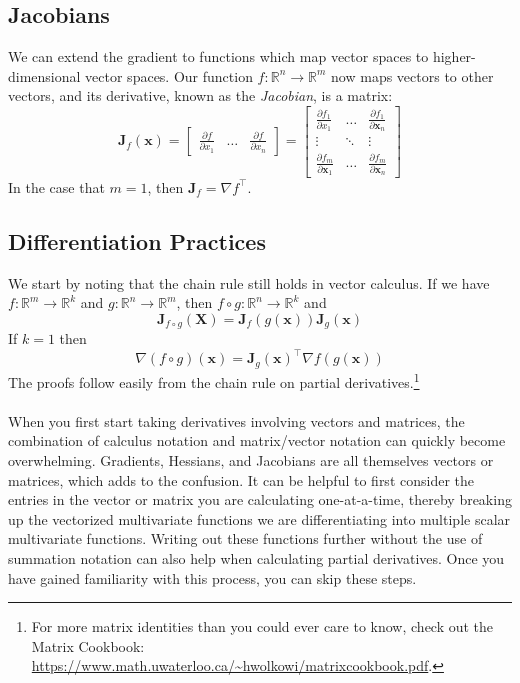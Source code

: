 \documentclass{article}
\begin{document}
\subsection{Jacobians}
We can extend the gradient to functions which map vector spaces to higher-dimensional vector spaces. Our function $f: \mathbb{R}^n \rightarrow \mathbb{R}^m$ now maps vectors to other vectors, and its derivative, known as the \textit{Jacobian}, is a matrix: $$\mathbf{J}_f(\mathbf{x}) = \begin{bmatrix} \frac{\partial f}{\partial x_1} & \hdots & \frac{\partial f}{\partial x_n} \end{bmatrix} = \begin{bmatrix} \frac{\partial f_1}{\partial x_1} & \hdots & \frac{\partial f_1}{\partial \mathbf{x}_n} \\ \vdots & \ddots & \vdots \\ \frac{\partial f_m}{\partial \mathbf{x}_1} & \hdots & \frac{\partial f_m}{\partial \mathbf{x}_n} \end{bmatrix}$$ In the case that $m = 1$, then $\mathbf{J}_f = \nabla f^{\top}$.

\subsection{Differentiation Practices}
We start by noting that the chain rule still holds in vector calculus. If we have $f: \mathbb{R}^m \rightarrow \mathbb{R}^k$ and $g: \mathbb{R}^n \rightarrow \mathbb{R}^m$, then $f \circ g: \mathbb{R}^n \rightarrow \mathbb{R}^k$ and $$\mathbf{J}_{f \circ g}(\mathbf{X}) = \mathbf{J}_f(g(\mathbf{x}))\mathbf{J}_g(\mathbf{x})$$ If $k = 1$ then $$\nabla (f \circ g)(\mathbf{x}) = \mathbf{J}_g(\mathbf{x})^{\top}\nabla f(g(\mathbf{x}))$$ The proofs follow easily from the chain rule on partial derivatives.\footnote{For more matrix identities than you could ever care to know, check out the Matrix Cookbook: \url{https://www.math.uwaterloo.ca/~hwolkowi/matrixcookbook.pdf}.}\\\\
When you first start taking derivatives involving vectors and matrices, the combination of calculus notation and matrix/vector notation can quickly become overwhelming. Gradients, Hessians, and Jacobians are all themselves vectors or matrices, which adds to the confusion. It can be helpful to first consider the entries in the vector or matrix you are calculating one-at-a-time, thereby breaking up the vectorized multivariate functions we are differentiating into multiple scalar multivariate functions. Writing out these functions further without the use of summation notation can also help when calculating partial derivatives. Once you have gained familiarity with this process, you can skip these steps.
\end{document}
